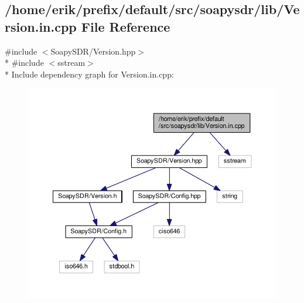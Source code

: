 \subsection{/home/erik/prefix/default/src/soapysdr/lib/\+Version.in.\+cpp File Reference}
\label{Version_8in_8cpp}
{\ttfamily \#include $<$Soapy\+S\+D\+R/\+Version.\+hpp$>$}\\*
{\ttfamily \#include $<$sstream$>$}\\*
Include dependency graph for Version.\+in.\+cpp\+:
\nopagebreak
\begin{figure}[H]
\begin{center}
\leavevmode
\includegraphics[width=350pt]{da/d43/Version_8in_8cpp__incl}
\end{center}
\end{figure}
